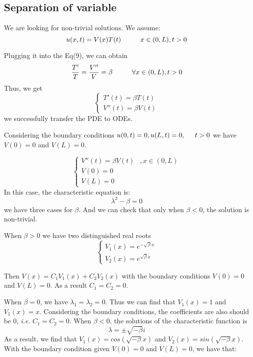 \documentclass[12pt]{article} %
\begin{document}
\subsection{Separation of variable}
\hspace{5mm}We are looking for non-trivial solutions. We assume:
$$
u(x,t) = V(x)T(t) \hspace{10mm} x \in (0,L),  t>0
$$\par
Plugging it into the Eq(9), we can obtain
$$
\frac{T'}{T} = \frac{V''}{V} = \beta \hspace{10mm} \forall x \in (0,L),  t>0
$$ Thus, we get
$$
\left\{\begin{array}{lcc}
T'(t) = \beta T(t)\\
V''(t) = \beta V(t)
\end{array}\right.
$$ we successfully transfer the PDE to ODEs. \par
Considering the boundary conditions $u(0,t) = 0, u(L, t) = 0, \hspace{5mm} t>0 $ we have $V(0) = 0$ and $V(L) = 0$.\par
$$
\left\{\begin{array}{lcc}
V''(t) = \beta V(t) & ,x \in (0,L)\\
V(0) = 0 \\
V(L) = 0
\end{array}\right.
$$ In this case, the characteristic equation is:
$$
\lambda^{2} - \beta = 0
$$we have three cases for $\beta$. And we can check that only when $\beta <0$, the solution is non-trivial. \par 
When $\beta >0$ we have two distinguished real roots
$$\left \{ \begin{array}{lcc}
V_{1}(x) = e^{-\sqrt{\beta}x} \\
V_{2}(x) = e^{\sqrt{\beta}x}
\end{array}\right.
$$\par
Then $V(x) = C_{1}V_{1}(x)+C_{2}V_{2}(x)$ with the boundary conditions $V(0) = 0$ and $V(L) = 0$. As a result $C_{1} = C_{2} =0$.\par
When $\beta =0$, we have $\lambda_{1} = \lambda_{2} = 0$. Thus we can find that $V_{1}(x)=1$ and $V_{1}(x)=x$. Considering the boundary conditions, the coefficients are also should be 0, \emph{i.e.} $C_{1} = C_{2} =0$. 
When $\beta <0$, the solutions of the characteristic function is 
$$
\lambda = \pm \sqrt{-\beta}i
$$As a result, we find that $V_{1}(x) = cos (\sqrt{-\beta }x)$ and $V_{2}(x) = sin (\sqrt{-\beta }x)$.
With the boundary condition given $V(0) = 0$ and $V(L) = 0$, we have that:
\end{document}

